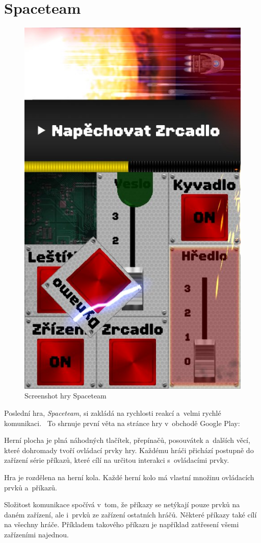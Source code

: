 \section{Spaceteam}

\begin{figure}
    \centering
    \includegraphics[width=0.5\linewidth]{assets/competitive-apps/spaceteam.jpg}
    \caption{Screenshot hry Spaceteam~\cite{henrysmithinc_spaceteam}}
    \label{fig:spaceteam}
\end{figure}

Poslední hra, \emph{Spaceteam}, si zakládá na rychlosti reakcí a~velmi rychlé
komunikaci.~\cite{henrysmithinc_spaceteam}
To shrnuje první věta na stránce hry v~obchodě Google Play:
\emph{}~\cite{henrysmithinc_spaceteam}

Herní plocha je plná náhodných tlačítek, přepínačů, posouvátek a~dalších věcí,
které dohromady tvoří ovládací prvky hry.
Každému hráči přichází postupně do zařízení série příkazů,
které cílí na určitou interakci s~ovládacími prvky.

Hra je rozdělena na herní kola.
Každé herní kolo má vlastní množinu ovládacích prvků a~příkazů.

Složitost komunikace spočívá v~tom,
že příkazy se netýkají pouze prvků na daném zařízení,
ale i~prvků ze zařízení ostatních hráčů.
Některé příkazy také cílí na všechny hráče.
Příkladem takového příkazu je například zatřesení všemi zařízeními najednou.

